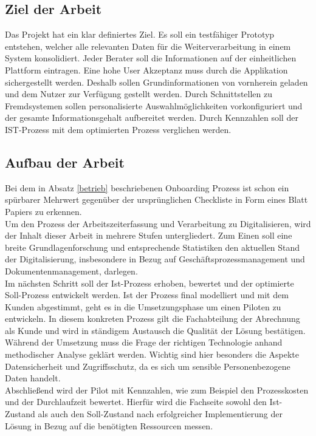 \documentclass[12pt]{article}
\begin{document}
\subsection{Ziel der Arbeit}
Das Projekt hat ein klar definiertes Ziel. Es soll ein testfähiger Prototyp entstehen, welcher alle relevanten Daten für die Weiterverarbeitung in einem System konsolidiert. Jeder Berater soll die Informationen auf der einheitlichen Plattform eintragen. Eine hohe User Akzeptanz muss durch die Applikation sichergestellt werden. Deshalb sollen Grundinformationen von vornherein geladen und dem Nutzer zur Verfügung gestellt werden. Durch Schnittstellen zu Fremdsystemen sollen personalisierte Auswahlmöglichkeiten vorkonfiguriert und der gesamte Informationsgehalt aufbereitet werden. Durch Kennzahlen soll der IST-Prozess mit dem optimierten Prozess verglichen werden. 
\subsection{Aufbau der Arbeit}
Bei dem in Absatz \ref{betrieb} beschriebenen Onboarding Prozess ist schon ein spürbarer Mehrwert gegenüber der ursprünglichen Checkliste in Form eines Blatt Papiers zu erkennen. \\
Um den Prozess der Arbeitszeiterfassung und Verarbeitung zu Digitalisieren, wird der Inhalt dieser Arbeit in mehrere Stufen untergliedert. Zum Einen soll eine breite Grundlagenforschung und entsprechende Statistiken den aktuellen Stand der Digitalisierung, insbesondere in Bezug auf Geschäftsprozessmanagement und Dokumentenmanagement, darlegen. \\
Im nächsten Schritt soll der Ist-Prozess erhoben, bewertet und der optimierte Soll-Prozess entwickelt werden. Ist der Prozess final modelliert und mit dem Kunden abgestimmt, geht es in die Umsetzungsphase um einen Piloten zu entwickeln. In diesem konkreten Prozess gilt die Fachabteilung der Abrechnung als Kunde und wird in ständigem Austausch die Qualität der Lösung bestätigen. \\
Während der Umsetzung muss die Frage der richtigen Technologie anhand methodischer Analyse geklärt werden. Wichtig sind hier besonders die Aspekte Datensicherheit und Zugriffsschutz, da es sich um sensible Personenbezogene Daten handelt. \\
Abschließend wird der Pilot mit Kennzahlen, wie zum Beispiel den Prozesskosten und der Durchlaufzeit bewertet. Hierfür wird die Fachseite sowohl den Ist-Zustand als auch den Soll-Zustand nach erfolgreicher Implementierung der Lösung in Bezug auf die benötigten Ressourcen messen.
\end{document}
